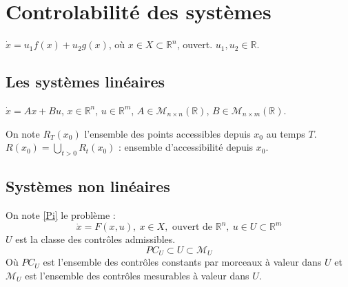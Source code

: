 
\section{Controlabilité des systèmes}
$\dot{x}=u_1f(x)+u_2g(x)$, où $x\in X\subset \mathbb{R}^n$, ouvert. $u_1, u_2\in\mathbb{R}$.

\Propo{}{\[\forall p\in X,\ \forall t,s\in\mathbb{R},\  \gamma_s^{-g}\circ\gamma_t^{-f}\circ\gamma_s^g\circ\gamma_t^f(p)=p \Leftrightarrow [f,g]\equiv 0\]}


\subsection{Les systèmes linéaires}
$\dot{x}=Ax+Bu$, $x\in\mathbb{R}^n$, $u\in\mathbb{R}^m$, $A\in\mathcal{M}_{n\times n}(\mathbb{R})$, $B\in\mathcal{M}_{n\times m}(\mathbb{R})$.

On note $R_T(x_0)$ l'ensemble des points accessibles depuis $x_0$ au temps $T$. \\
$R(x_0)=\bigcup_{t>0} R_t(x_0)$ : ensemble d'accessibilité depuis $x_0$. 


\subsection{Systèmes non linéaires}
On note \ref{Pi} le problème  : 
\begin{equation} \label{Pi} \tag{$\Pi$} \dot{x}=F(x,u),\ x\in X,\text{ ouvert de } \mathbb{R}^n,\ u\in U\subset \mathbb{R}^m \end{equation}
$U$ est la classe des contrôles admissibles.\\
\[PC_U\subset U \subset \mathcal{M}_U\]
Où $PC_U$ est l'ensemble des contrôles constants par morceaux à valeur dans $U$ et $\mathcal{M}_U$ est l'ensemble des contrôles mesurables à valeur dans $U$.

